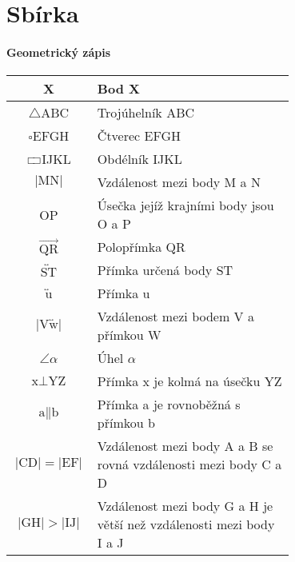 \chapter{Sbírka}

\subsubsection{Geometrický zápis}
\begin{tabular}{|c|p{0.7\linewidth}|}
    \hline
    X                                                      & Bod X                                                               \\ \hline
    $\triangle$ABC                                         & Trojúhelník ABC                                                     \\ \hline
    $\square$EFGH                                          & Čtverec EFGH                                                        \\ \hline
    $\rectangle$IJKL                                       & Obdélník IJKL                                                       \\ \hline
    $\lvert \text{MN} \rvert$                              & Vzdálenost mezi body M a N                                          \\ \hline
    OP                                                     & Úsečka jejíž krajními body jsou O a P                               \\ \hline
    $\overrightarrow{\text{QR}}$                           & Polopřímka QR                                                       \\ \hline
    $\overleftrightarrow{\text{ST}}$                       & Přímka určená body ST                                               \\ \hline
    $\overleftrightarrow{\text{u}}$                        & Přímka u                                                            \\ \hline
    $\lvert \text{V} \overleftrightarrow{\text{w}} \rvert$ & Vzdálenost mezi bodem V a přímkou W                                 \\ \hline
    $\angle \alpha $                                       & Úhel $\alpha$                                                       \\ \hline
    $ \text{x} \perp \text{YZ} $                           & Přímka x je kolmá na úsečku YZ                                      \\ \hline
    $\text{a} \| \text{b}$                                 & Přímka a je rovnoběžná s přímkou b                                  \\ \hline
    $\lvert \text{CD} \rvert = \lvert \text{EF} \rvert$    & Vzdálenost mezi body A a B se rovná vzdálenosti mezi body C a D     \\ \hline
    $\lvert \text{GH} \rvert > \lvert \text{IJ} \rvert$    & Vzdálenost mezi body G a H je větší než vzdálenosti mezi body I a J \\ \hline
\end{tabular}

\newpage
